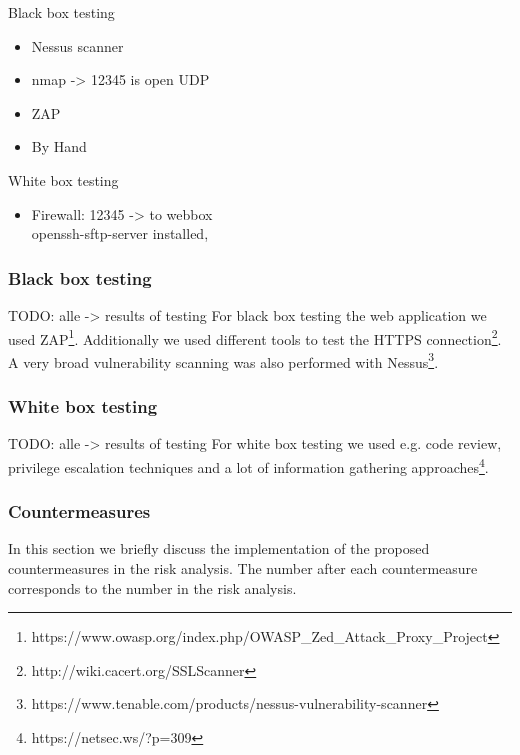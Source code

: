 \documentclass[english]{article}
\begin{document}
Black box testing
\begin{itemize}
	
	\item Nessus scanner
	\item nmap -> 12345 is open UDP
	\item ZAP
	\item By Hand
	
\end{itemize}

White box testing

\begin{itemize}
	\item Firewall: 12345 -> to webbox\\ openssh-sftp-server installed,  
\end{itemize}

\subsubsection{Black box testing} TODO: alle -> results of testing
For black box testing the web application we used ZAP\footnote{https://www.owasp.org/index.php/OWASP\_Zed\_Attack\_Proxy\_Project}. Additionally we used different tools to test the HTTPS connection\footnote{http://wiki.cacert.org/SSLScanner}. A very broad vulnerability scanning was also performed with Nessus\footnote{https://www.tenable.com/products/nessus-vulnerability-scanner}.

\subsubsection{White box testing} TODO: alle -> results of testing
For white box testing we used e.g. code review, privilege escalation techniques and a lot of information gathering approaches\footnote{https://netsec.ws/?p=309}.

\subsubsection{Countermeasures}
In this section we briefly discuss the implementation of the proposed countermeasures in the risk analysis. The number after each countermeasure corresponds to the number in the risk analysis.
\end{document}
